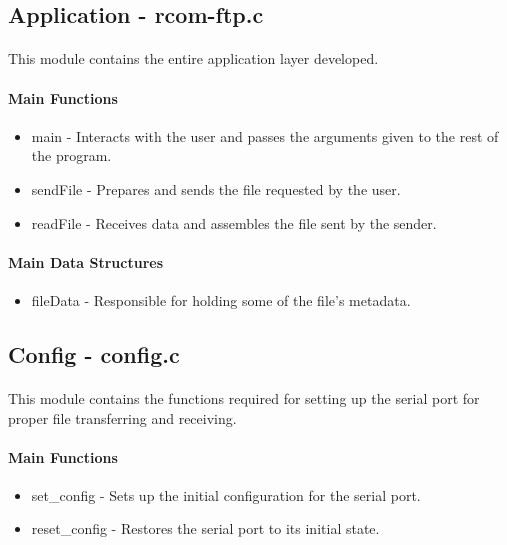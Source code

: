 \documentclass[11pt]{article}
\begin{document}
\subsection{Application - rcom-ftp.c}

\paragraph{}This module contains the entire application layer developed.

\paragraph{Main Functions}

\begin{itemize}
        \item{main - Interacts with the user and passes the arguments given to the rest of the program.}
        \item{sendFile - Prepares and sends the file requested by the user.}
        \item{readFile - Receives data and assembles the file sent by the sender.}
\end{itemize}

\paragraph{Main Data Structures}

\begin{itemize}
        \item{fileData - Responsible for holding some of the file's metadata.}
\end{itemize}

\subsection{Config - config.c}

\paragraph{}This module contains the functions required for setting up the serial port for proper file transferring and receiving.

\paragraph{Main Functions}

\begin{itemize}
        \item{set\_config - Sets up the initial configuration for the serial port.}
        \item{reset\_config - Restores the serial port to its initial state.}
\end{itemize}
\end{document}
